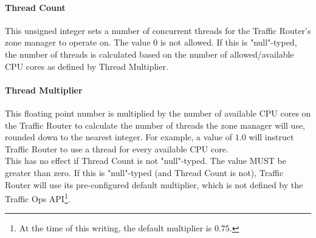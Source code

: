 \paragraph{Thread Count}
This unsigned integer sets a number of concurrent threads for the Traffic
Router's zone manager to operate on. The value 0 is not allowed. If this is
"null"-typed, the number of threads is calculated based on the number of
allowed/available CPU cores as defined by Thread Multiplier.

\paragraph{Thread Multiplier}
This floating point number is multiplied by the number of available CPU cores on
the Traffic Router to calculate the number of threads the zone manager will use,
rounded down to the nearest integer. For example, a value of $1.0$ will instruct
Traffic Router to use a thread for every available CPU core.\\
This has no effect if Thread Count is not "null"-typed. The value MUST be
greater than zero. If this is "null"-typed (and Thread Count is not), Traffic
Router will use its pre-configured default multiplier, which is not defined by
the Traffic Ops API\footnote{At the time of this writing, the default multiplier
is $0.75$.}.
